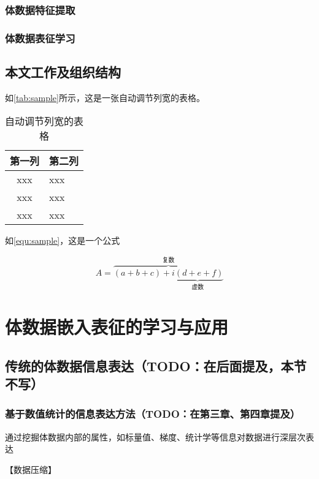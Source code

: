 \subsection{体数据特征提取}
\subsection{体数据表征学习}
\section{本文工作及组织结构}


\par 如\autoref{tab:sample}所示，这是一张自动调节列宽的表格。

\begin{table}[htbp]
    \caption{\label{tab:sample}自动调节列宽的表格}
    \begin{tabularx}{\linewidth}{c|X<{\centering}}
        \hline
        第一列 & 第二列 \\ \hline
        xxx & xxx \\ \hline
        xxx & xxx \\ \hline
        xxx & xxx \\ \hline
    \end{tabularx}
\end{table}


\par 如\autoref{equ:sample}，这是一个公式

\begin{equation}
    \label{equ:sample}
    A=\overbrace{(a+b+c)+\underbrace{i(d+e+f)}_{\text{虚数}}}^{\text{复数}}
\end{equation}

\chapter{体数据嵌入表征的学习与应用}

\section{传统的体数据信息表达（TODO：在后面提及，本节不写）}
\subsection{基于数值统计的信息表达方法（TODO：在第三章、第四章提及）}
通过挖掘体数据内部的属性，如标量值、梯度、统计学等信息对数据进行深层次表达

【数据压缩】

